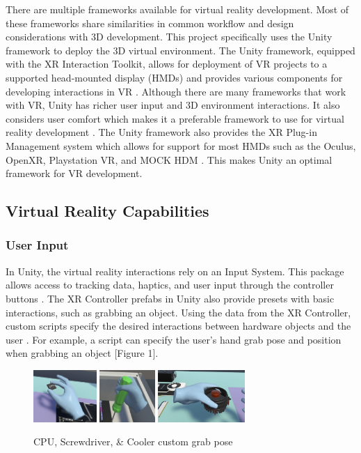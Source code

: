 \documentclass[10pt,twocolumn]{article}
\begin{document}
\par There are multiple frameworks available for virtual reality development. Most of these frameworks share similarities in common workflow and design considerations with 3D development. This project specifically uses the Unity framework to deploy the 3D virtual environment. The Unity framework, equipped with the XR Interaction Toolkit, allows for deployment of VR projects to a supported head-mounted display (HMDs) and provides various components for developing interactions in VR \cite{Unity2023VRDevelopment}. Although there are many frameworks that work with VR, Unity has richer user input and 3D environment interactions. It also considers user comfort which makes it a preferable framework to use for virtual reality development \cite{Unity2023VRDevelopment}. The Unity framework also provides the XR Plug-in Management system which allows for support for most HMDs such as the Oculus, OpenXR, Playstation VR, and MOCK HDM \cite{Unity2023VRDevelopment}. This makes Unity an optimal framework for VR development.

\subsection{Virtual Reality Capabilities}

\subsubsection{User Input}

\par In Unity, the virtual reality interactions rely on an Input System. This package allows access to tracking data, haptics, and user input through the controller buttons \cite{Unity2023VRDevelopment}. The XR Controller prefabs in Unity also provide presets with basic interactions, such as grabbing an object. Using the data from the XR Controller, custom scripts specify the desired interactions between hardware objects and the user \cite{Valem2022HowToVR}. For example, a script can specify the user’s hand grab pose and position when grabbing an object [Figure 1]. 

\begin{figure}
    \centering
    \includegraphics[width=2.4cm]{images/CPUCustomGrabPose.png}
    \includegraphics[width=2.1cm]{images/ScrewdriverCustomGrabPose.png}
    \includegraphics[width=3.3cm]{images/CoolerCustomGrabPose.png}
    \caption{CPU, Screwdriver, \& Cooler custom grab pose}
\end{figure}
\end{document}
